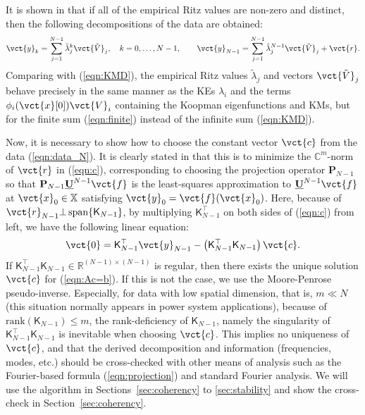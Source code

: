 \documentclass[a4paper,10pt]{article}
\def\bbR{{\mathbb{R}}}
\def\bbC{{\mathbb{C}}}
\begin{document}
It is shown in \cite{Rowley_JFM641} that if all of the empirical Ritz values are non-zero and distinct, then the following decompositions of the data are obtained:
\begin{equation}
\vct{y}_k=\sum^{N-1}_{j=1}\tilde{\lambda}^k_j\vct{\tilde{V}}_j,\makebox[1em]{}
k=0,\ldots,N-1,\makebox[2em]{}
\vct{y}_{N-1}=\sum^{N-1}_{j=1}\tilde{\lambda}^{N-1}_j\vct{\tilde{V}}_j+\vct{r}.
\label{eqn:finite}
\end{equation}
Comparing with (\ref{eqn:KMD}), the empirical Ritz values $\tilde{\lambda}_j$ and vectors $\vct{\tilde{V}}_j$ behave precisely in the same manner as the KEs $\lambda_i$ and the terms $\phi_i(\vct{x}[0])\vct{V}_i$ containing the Koopman eigenfunctions and KMs, but for the finite sum (\ref{eqn:finite}) instead of the infinite sum (\ref{eqn:KMD}).  

%
Now, it is necessary to show how to choose the constant vector $\vct{c}$ from the data (\ref{eqn:data_N}).    
It is clearly stated in \cite{Marko_CHAOS22} that this is to minimize the $\bbC^{m}$-norm of $\vct{r}$ in (\ref{eqn:c}), corresponding to choosing the projection operator $\mathbf{P}_{N-1}$ so that $\mathbf{P}_{N-1}\mathbf{\underline{U}}^{N-1}\vct{f}$ is the least-squares approximation to $\mathbf{\underline{U}}^{N-1}\vct{f}$ at $\vct{x}_0\in\mathbb{X}$ satisfying $\vct{y}_0=\vct{f}(\vct{x}_0)$.  
Here, because of $\vct{r}_{N-1}\bot\,\mathrm{span}\{\mathsf{K}_{N-1}\}$, by multiplying $\mathsf{K}_{N-1}^\top$ on both sides of (\ref{eqn:c}) from left, we have the following linear equation:
\begin{equation}
\vct{0}=\mathsf{K}_{N-1}^\top\vct{y}_{N-1}-\left(\mathsf{K}_{N-1}^\top\mathsf{K}_{N-1}\right)\vct{c}.
\label{eqn:Ac=b}
\end{equation}
If $\mathsf{K}_{N-1}^\top\mathsf{K}_{N-1}\in\bbR^{(N-1)\times(N-1)}$ is regular, then there exists the unique solution $\vct{c}$ for (\ref{eqn:Ac=b}).  
If this is not the case, we use the Moore-Penrose pseudo-inverse.  
Especially, for data with low spatial dimension, that is, $m\ll N$ (this situation normally appears in power system applications), because of $\mathrm{rank}(\mathsf{K}_{N-1})\leq m$, the rank-deficiency of $\mathsf{K}_{N-1}$, namely the singularity of $\mathsf{K}_{N-1}^\top\mathsf{K}_{N-1}$ is inevitable when choosing $\vct{c}$.  
This implies no uniqueness of $\vct{c}$, and that the derived decomposition and information (frequencies, modes, etc.) should be cross-checked with other means of analysis such as the Fourier-based formula (\ref{eqn:projection}) and standard Fourier analysis.  
We will use the algorithm in Sections~\ref{sec:coherency} to \ref{sec:stability} and show the cross-check in Section~\ref{sec:coherency}.  
\end{document}
